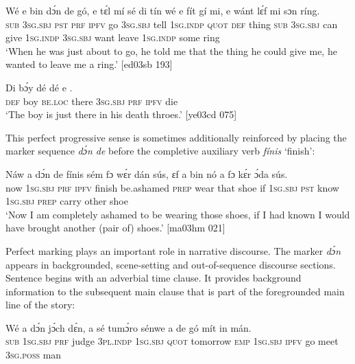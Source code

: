 \ea%
    \label{ex:key:402}
    \gll Wé  e    bin  dɔ́n  de  gó,  e    tɛ́l  mí    sé  di  tín    wé
e    fít  gí  mi,    e    wánt  lɛ́f    mi    sɔn    ríng.\\
\textsc{sub}  \textsc{3sg.sbj}  \textsc{pst}  \textsc{prf}  \textsc{ipfv}  go  \textsc{3sg.sbj}  tell  \textsc{1sg.indp}  \textsc{quot}  \textsc{def}  thing  \textsc{sub}
\textsc{3sg.sbj}  can  give  \textsc{1sg.indp}  \textsc{3sg.sbj}  want  leave  \textsc{1sg.indp}  some  ring\\

\glt ‘When he was just about to go, he told me that the thing he could give me, 
he wanted to leave me a ring.’ [ed03sb 193]
\z


\ea%
    \label{ex:key:403}
    \gll Di  bɔ́y  dé    dé    e        .\\
\textsc{def}  boy  \textsc{be.loc}  there  \textsc{3sg.sbj}  \textsc{prf}  \textsc{ipfv}  die\\

\glt ‘The boy is just there in his death throes.’ [ye03cd 075]
\z

This perfect progressive sense is sometimes additionally reinforced by placing the marker sequence \textit{dɔ́n de} before the completive auxiliary verb \textit{fínis} ‘finish’: 


\ea%
    \label{ex:key:404}
    \gll Náw    a    dɔ́n    de  fínis  sém      fɔ  wɛ́r    dán    sús,
ɛf  a    bin  nó    a    fɔ  kɛ́r    ɔ́da    sús.\\
now    \textsc{1sg.sbj}  \textsc{prf}    \textsc{ipfv}  finish  be.ashamed  \textsc{prep}  wear  that    shoe
if  \textsc{1sg.sbj}  \textsc{pst}  know  \textsc{1sg.sbj}  \textsc{prep}  carry  other  shoe\\

\glt ‘Now I am completely ashamed to be wearing those shoes, if I had known
I would have brought another (pair of) shoes.’ [ma03hm 021]
\z

Perfect marking plays an important role in narrative discourse. The marker \textit{dɔ́n} appears in backgrounded, scene-setting and out-of-sequence discourse sections. Sentence  begins with an adverbial time clause. It provides background information to the subsequent main clause that is part of the foregrounded main line of the story:


\ea%
    \label{ex:key:405}
    \gll Wé  a    dɔ́n  jɔ́ch    dɛ́n,    a    sé    tumɔ́ro    sénwe
a    de  gó  mít  in    mán.\\
\textsc{sub}  \textsc{1sg.sbj}  \textsc{prf}  judge  \textsc{3pl.indp}  \textsc{1sg.sbj}  \textsc{quot}    tomorrow  \textsc{emp}
\textsc{1sg.sbj}  \textsc{ipfv}  go meet  \textsc{3sg.poss}  man\\

